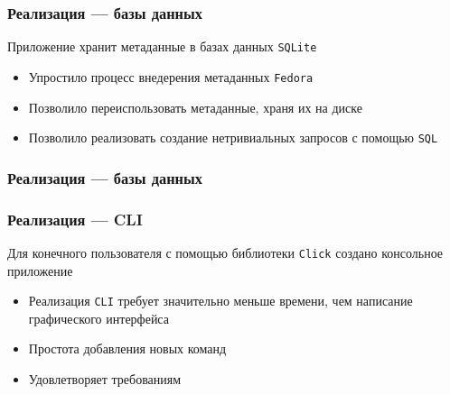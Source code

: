 \documentclass{beamer}
\begin{document}


%
\begin{frame}[fragile]
	\frametitle{Реализация --- базы данных}
	Приложение хранит метаданные в базах данных \texttt{SQLite}
	\begin{itemize}
		\item Упростило процесс внедерения метаданных \texttt{Fedora}
		\item Позволило переиспользовать метаданные, храня их на диске
		\item Позволило реализовать создание нетривиальных запросов с помощью \texttt{SQL}
	\end{itemize}
\end{frame}

\begin{frame}[fragile]
	\frametitle{Реализация --- базы данных}
	\begin{figure}
		\centering
		
	\end{figure}
\end{frame}
%

\begin{frame}[fragile]
	\frametitle{Реализация --- CLI}
	Для конечного пользователя с помощью библиотеки \texttt{Click} создано консольное приложение
	\begin{itemize}
		\item Реализация \texttt{CLI} требует значительно меньше времени, чем написание графического интерфейса
		\item Простота добавления новых команд
		\item Удовлетворяет требованиям
	\end{itemize}

	\begin{figure}[ht]
		\centering
		
		\label{cli}
	\end{figure}
\end{frame}
\end{document}
